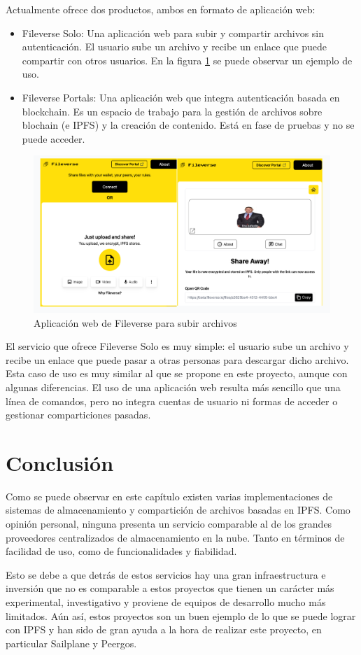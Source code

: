 Actualmente ofrece dos productos, ambos en formato de aplicación web:
\begin{itemize}
    \item Fileverse Solo: Una aplicación web para subir y compartir archivos sin autenticación. El usuario sube un archivo y recibe un enlace que puede compartir con otros usuarios. En la figura \ref{fig:fileverse} se puede observar un ejemplo de uso.
    \item Fileverse Portals: Una aplicación web que integra autenticación basada en blockchain. Es un espacio de trabajo para la gestión de archivos sobre blochain (e IPFS) y la creación de contenido. Está en fase de pruebas y no se puede acceder.
\end{itemize}
\begin{figure}[H]
    \centering
    \small
    \includegraphics[width=\linewidth]{images/fileverse.png}
    \caption{Aplicación web de Fileverse para subir archivos}
    \label{fig:fileverse}
\end{figure}

El servicio que ofrece Fileverse Solo es muy simple: el usuario sube un archivo y recibe un enlace que puede pasar a otras personas para descargar dicho archivo.
Esta caso de uso es muy similar al que se propone en este proyecto, aunque con algunas diferencias. El uso de una
aplicación web resulta más sencillo que una línea de comandos, pero no integra cuentas de usuario ni formas de acceder o gestionar comparticiones pasadas.


\section{Conclusión}

Como se puede observar en este capítulo existen varias implementaciones de sistemas de almacenamiento y compartición de
archivos basadas en IPFS. Como opinión personal, ninguna presenta un servicio comparable al de los grandes
proveedores centralizados de almacenamiento en la nube. Tanto en términos de facilidad de uso, como de funcionalidades y
fiabilidad.

Esto se debe a que detrás de estos servicios hay una gran infraestructura e inversión que no es comparable a estos proyectos
que tienen un carácter más experimental, investigativo y proviene de equipos de desarrollo mucho más limitados. Aún así, estos proyectos son un buen ejemplo de lo que se puede lograr con IPFS y
han sido de gran ayuda a la hora de realizar este proyecto, en particular Sailplane y Peergos.
